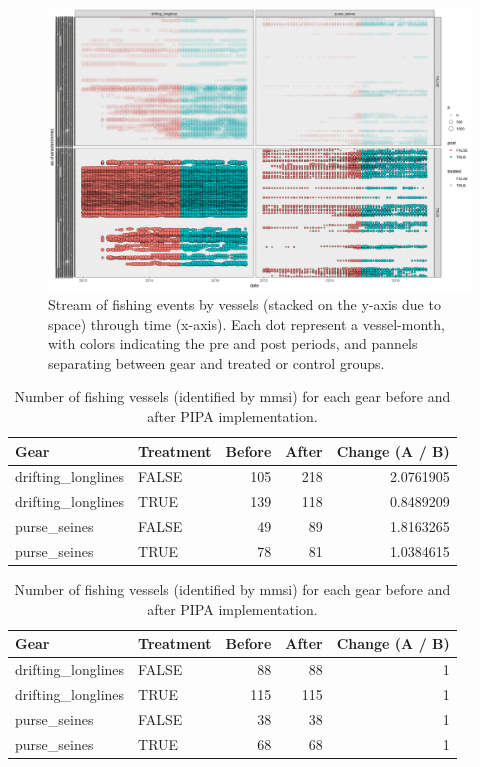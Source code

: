 \documentclass[]{article}
\begin{document}
\begin{figure}
\centering
\includegraphics{../img/BACI_strict_gear.png}
\caption{\label{fig:baci_strict}Stream of fishing events by vessels
(stacked on the y-axis due to space) through time (x-axis). Each dot
represent a vessel-month, with colors indicating the pre and post
periods, and pannels separating between gear and treated or control
groups.}
\end{figure}

\begin{table}[H]

\caption{\label{tab:unnamed-chunk-4}\label{tab:baci_n}Number of fishing vessels (identified by mmsi) for each gear before and after PIPA implementation.}
\centering
\begin{tabular}[t]{llrrr}
\toprule
Gear & Treatment & Before & After & Change (A / B)\\
\midrule
drifting\_longlines & FALSE & 105 & 218 & 2.0761905\\
drifting\_longlines & TRUE & 139 & 118 & 0.8489209\\
purse\_seines & FALSE & 49 & 89 & 1.8163265\\
purse\_seines & TRUE & 78 & 81 & 1.0384615\\
\bottomrule
\end{tabular}
\end{table}

\begin{table}[H]

\caption{\label{tab:unnamed-chunk-5}\label{tab:baci_n_s}Number of fishing vessels (identified by mmsi) for each gear before and after PIPA implementation.}
\centering
\begin{tabular}[t]{llrrr}
\toprule
Gear & Treatment & Before & After & Change (A / B)\\
\midrule
drifting\_longlines & FALSE & 88 & 88 & 1\\
drifting\_longlines & TRUE & 115 & 115 & 1\\
purse\_seines & FALSE & 38 & 38 & 1\\
purse\_seines & TRUE & 68 & 68 & 1\\
\bottomrule
\end{tabular}
\end{table}
\end{document}
